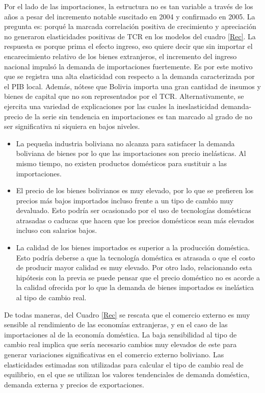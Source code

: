 \documentclass[12pt,letterpaper]{article}
\begin{document}
Por el lado de las importaciones, la estructura no es tan variable a través de los años a pesar del incremento notable suscitado en 2004 y confirmado en 2005. La pregunta es: porqué la marcada correlación positiva de crecimiento y apreciación no generaron elasticidades positivas de TCR en los modelos del cuadro \ref{Rec}. La respuesta es porque prima el efecto ingreso, eso quiere decir que sin importar el encarecimiento relativo de los bienes extranjeros, el incremento del ingreso nacional impulsó la demanda de importaciones fuertemente. Es por este motivo que se registra una alta elasticidad con respecto a la demanda caracterizada por el PIB local. Además, nótese que Bolivia importa una gran cantidad de insumos y bienes de capital que no son representados por el TCR. Alternativamente, se ejercita una variedad de explicaciones por las cuales la ineslasticidad demanda-precio de la serie sin tendencia en importaciones es tan marcado al grado de no ser significativa ni siquiera en bajos niveles.

\begin{itemize}
\item La pequeña industria boliviana no alcanza para satisfacer la demanda boliviana de bienes por lo que las importaciones son precio inelásticas. Al mismo tiempo, no existen productos domésticos para sustituir a las importaciones.
\item El precio de los bienes bolivianos es muy elevado, por lo que se prefieren los precios más bajos importados incluso frente a un tipo de cambio muy devaluado. Esto podría ser ocasionado por el uso de tecnologías domésticas atrasadas o caducas que hacen que los precios domésticos sean más elevados incluso con salarios bajos.
\item La calidad de los bienes importados es superior a la producción doméstica. Esto podría deberse a que la tecnología doméstica es atrasada o que el costo de producir mayor calidad es muy elevado. Por otro lado, relacionando esta hipótesis con la previa se puede pensar que el precio doméstico no es acorde a la calidad ofrecida por lo que la demanda de bienes importados es inelástica al tipo de cambio real. 
\end{itemize}

De todas maneras, del Cuadro \ref{Rec} se rescata que el comercio externo es muy sensible al rendimiento de las economías extranjeras, y en el caso de las importaciones al de la economía doméstica. La baja sensibilidad al tipo de cambio real implica que sería necesario cambios muy elevados de este para generar variaciones significativas en el comercio externo boliviano. Las elasticidades estimadas son utilizadas para calcular el tipo de cambio real de equilibrio, en el que se utilizan los valores tendenciales de demanda doméstica, demanda externa y precios de exportaciones.
\end{document}
